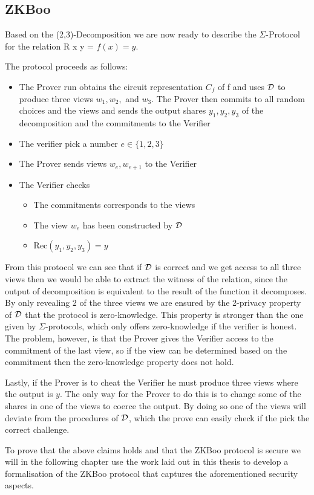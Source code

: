 
\subsection{ZKBoo}
\label{subsec:general:zkboo}
Based on the (2,3)-Decomposition we are now ready to describe the
$\Sigma$-Protocol for the relation R x y = $f(x) = y$.

The protocol proceeds as follows:
\begin{itemize}
  \item The Prover run obtains the circuit representation $C_{f}$ of f and uses
    $\mathcal{D}$ to produce three views $w_{1}, w_{2},$ and $w_{3}$.
    The Prover then commits to all random choices and the views and sends the
    output shares $y_{1}, y_{2}, y_{3}$ of the decomposition and the commitments to the Verifier
  \item The verifier pick a number $e \in \{1,2,3\}$
  \item The Prover sends views $w_{e}, w_{e+1}$ to the Verifier
  \item The Verifier checks
    \begin{itemize}
      \item The commitments corresponds to the views
      \item The view $w_{e}$ has been constructed by $\mathcal{D}$
      \item Rec$(y_{1}, y_{2}, y_{3}) = y$
    \end{itemize}
\end{itemize}

From this protocol we can see that if $\mathcal{D}$ is correct and we get access to
all three views then we would be able to extract the witness of the relation,
since the output of decomposition is equivalent to the result of the function it decomposes.
By only revealing 2 of the three views we are ensured by the 2-privacy property
of $\mathcal{D}$ that the protocol is zero-knowledge. This
property is stronger than the one given by $\Sigma$-protocols, which only offers
zero-knowledge if the verifier is honest. The problem, however, is that the
Prover gives the Verifier access to the commitment of the last view, so if the
view can be determined based on the commitment then the zero-knowledge property
does not hold.

Lastly, if the Prover is to cheat the Verifier he must produce three views where
the output is $y$. The only way for the Prover to do this is to change some of
the shares in one of the views to coerce the output. By doing so one of the
views will deviate from the procedures of $\mathcal{D}$, which the prove can easily
check if the pick the correct challenge.

To prove that the above claims holds and that the ZKBoo protocol is secure we will
in the following chapter use the work laid out in this thesis to develop a
formalisation of the ZKBoo protocol that captures the aforementioned security aspects.

